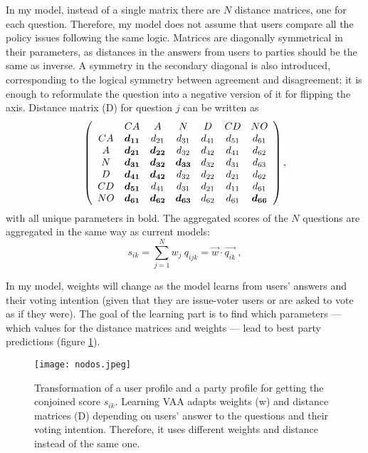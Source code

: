 \documentclass{scrartcl}
\begin{document}
In my model, instead of a single matrix there are $N$ distance matrices, one for each question. Therefore, my model does not assume that users compare all the policy issues following the same logic. Matrices are diagonally symmetrical in their parameters, as distances in the answers from users to parties should be the same as inverse. A symmetry in the secondary diagonal is also introduced, corresponding to the logical symmetry between agreement and disagreement; it is enough to reformulate the question into a negative version of it for flipping the axis. Distance matrix (D) for question $j$ can be written as
\begin{equation}
\left( \begin{array}{c c c c c c c}
       & CA & A & N & D & CD & NO\\
    CA & \boldsymbol{d_{11}} & d_{21} & d_{31} & d_{41} & d_{51} & d_{61} \\
    A & \boldsymbol{d_{21}} & \boldsymbol{d_{22}} & d_{32} & d_{42} & d_{41} & d_{62} \\
    N & \boldsymbol{d_{31}} & \boldsymbol{d_{32}} & \boldsymbol{d_{33}} & d_{32} & d_{31} & d_{63} \\
    D & \boldsymbol{d_{41}} & \boldsymbol{d_{42}} & d_{32} & d_{22} & d_{21} & d_{62} \\
    CD & \boldsymbol{d_{51}} & d_{41} & d_{31} & d_{21} & d_{11} & d_{61} \\
    NO & \boldsymbol{d_{61}} & \boldsymbol{d_{62}} & \boldsymbol{d_{63}} & d_{62} & d_{61} & \boldsymbol{d_{66}}
\end{array}
\right),
\end{equation}
with all unique parameters in bold. The aggregated scores of the $N$ questions are aggregated in the same way as current models:
\begin{equation}
    s_{ik} = \sum\limits_{j=1}^N w_j \: q_{ijk} = \Vec{w} \cdot \Vec{q_{ik}} \: ,
\end{equation}

In my model, weights will change as the model learns from users' answers and their voting intention (given that they are issue-voter users or are asked to vote as if they were). The goal of the learning part is to find which parameters --- which values for the distance matrices and weights --- lead to best party predictions (figure \ref{fig:nodos}).

\begin{figure}[h]
    \centering 
    \texttt{[image: nodos.jpeg]}
    \caption{Transformation of a user profile and a party profile for getting the conjoined score $s_{ik}$. Learning VAA adapts weights (w) and distance matrices (D) depending on users' answer to the questions and their voting intention. Therefore, it uses different weights and distance instead of the same one.}
    \label{fig:nodos}
\end{figure}
\end{document}
